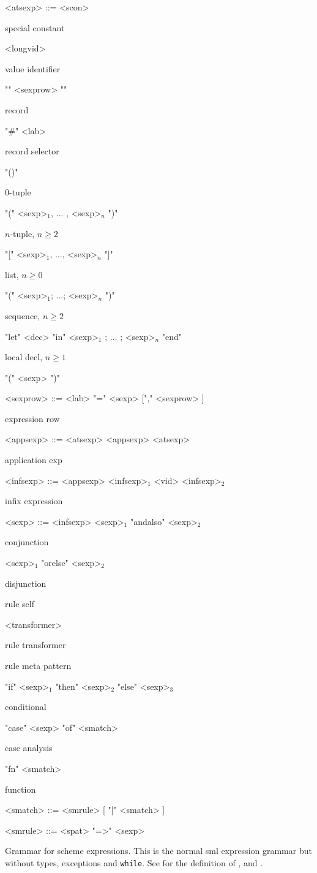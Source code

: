 \begin{nonfloatingfigure}

\setlength{\grammarindent}{7em}

\newcommand{\cmt}[1]{\parbox{8em}{\small{#1}}}

\begin{grammar}
 
  <atsexp> ::= <scon>                                            \hfill \cmt{special constant}
  \alt ["op"] <longvid>                                          \hfill \cmt{value identifier}
  \alt "{" <sexprow> "}"                                         \hfill \cmt{record}
  \alt "\#" <lab>                                                \hfill \cmt{record selector}
  \alt "()"                                                      \hfill \cmt{$0$-tuple}
  \alt "(" <sexp>$_1$, $\ldots$ , <sexp>$_n$ ")"                 \hfill \cmt{$n$-tuple, $n \geq 2$}
  \alt "[" <sexp>$_1$, $\ldots$, <sexp>$_n$ "]"                  \hfill \cmt{list, $n \geq 0$}
  \alt "(" <sexp>$_1$; $\ldots$; <sexp>$_n$ ")"                  \hfill \cmt{sequence, $n \geq 2$}  
  \alt "let" <dec> "in" <sexp>$_1$ ; $\ldots$ ; <sexp>$_n$ "end" \hfill \cmt{local decl, $n \geq 1$}
  \alt "(" <sexp> ")"
  
  <sexprow> ::= <lab> "=" <sexp> ["," <sexprow> ]          \hfill \cmt{expression row}

  <appsexp> ::= <atsexp>
  \alt <appsexp> <atsexp>                                  \hfill \cmt{application exp}

  <infsexp> ::= <appsexp>
  \alt <infsexp>$_1$ <vid> <infsexp>$_2$                   \hfill \cmt{infix expression}
  
  <sexp> ::= <infsexp>
  \alt <sexp>$_1$ "andalso" <sexp>$_2$                     \hfill \cmt{conjunction}
  \alt <sexp>$_1$ "orelse"  <sexp>$_2$                     \hfill \cmt{disjunction}
                                           \hfill \cmt{rule self}
  \alt <transformer>                                       \hfill \cmt{rule transformer}
                                   \hfill \cmt{rule meta pattern}
  \alt "if" <sexp>$_1$ "then" <sexp>$_2$ "else" <sexp>$_3$ \hfill \cmt{conditional}
  \alt "case" <sexp> "of" <smatch>                         \hfill \cmt{case analysis}
  \alt "fn" <smatch>                                       \hfill \cmt{function}
  
  <smatch> ::= <smrule> [ "|" <smatch> ]
  
  <smrule> ::= <spat> "=>" <sexp>
\end{grammar}

  \caption{Grammar for scheme expressions. This is the normal sml expression
    grammar but without types, exceptions and \texttt{while}.  See  for
    the definition of ,  and .}
  \label{fig:scheme-expressions}
\end{nonfloatingfigure}


